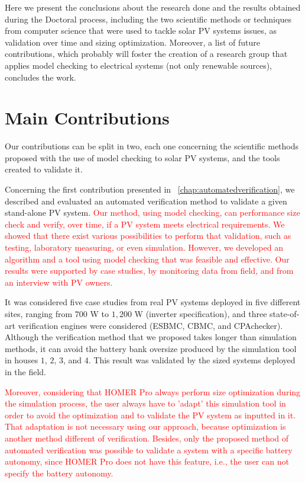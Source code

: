 Here we present the conclusions about the research done and the results obtained during the Doctoral process, including the two scientific methods or techniques from computer science that were used to tackle solar PV systems issues, as validation over time and sizing optimization. Moreover, a list of future contributions, which probably will foster the creation of a research group that applies model checking to electrical systems (not only renewable sources), concludes the work.

\section{Main Contributions}

Our contributions can be split in two, each one concerning the scientific methods proposed with the use of model checking to solar PV systems, and the tools created to validate it.

Concerning the first contribution presented in ~\autoref{chap:automatedverification}, we described and evaluated an automated verification method to validate a given stand-alone PV system. \textcolor{red}{Our method, using model checking, can performance size check and verify, over time, if a PV system meets electrical requirements. We showed that there exist various possibilities to perform that validation, such as testing, laboratory measuring, or even simulation. However, we developed an algorithm and a tool using model checking that was feasible and effective. Our results were supported by case studies, by monitoring data from field, and from an interview with PV owners.}

It was considered five case studies from real PV systems deployed in five different sites, ranging from $700$ W to $1,200$ W (inverter specification), and three state-of-art verification engines were considered (ESBMC, CBMC, and CPAchecker). Although the verification method that we proposed takes longer than simulation methods, it can avoid the battery bank oversize produced by the simulation tool in houses $1$, $2$, $3$, and $4$. This result was validated by the sized systems deployed in the field.

\textcolor{red}{Moreover, considering that HOMER Pro always perform size optimization during the simulation process, the user always have to 'adapt' this simulation tool in order to avoid the optimization and to validate the PV system as inputted in it. That adaptation is not necessary using our approach, because optimization is another method different of verification. Besides, only the proposed method of automated verification was possible to validate a system with a specific battery autonomy, since HOMER Pro does not have this feature, i.e., the user can not specify the battery autonomy.}

